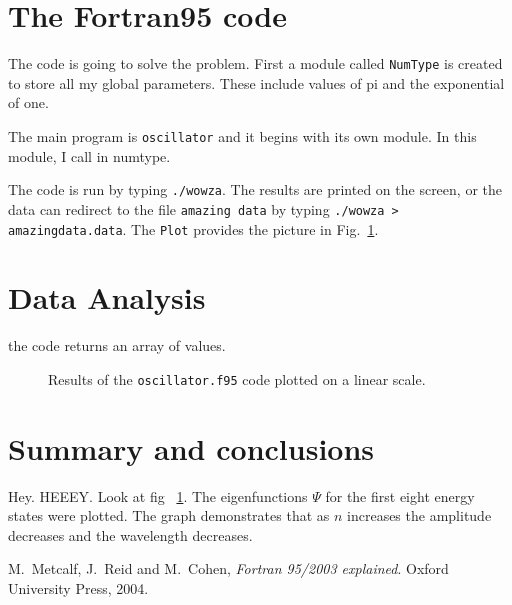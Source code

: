 \documentclass[12pt]{article}
\begin{document}
\section{The Fortran95 code}

The code is going to solve the problem. First a module called {\tt NumType} is created to store all my global parameters. These include values of pi and the exponential of one. 


The main program is {\tt oscillator} and it begins with its own module. In this module, I call in numtype.



The code is run by typing {\tt ./wowza}. The results are printed on the screen, or the data can redirect to the file {\tt amazing data} by typing {\tt ./wowza > amazingdata.data}. The {\tt Plot} provides the picture in Fig.\ \ref{orbitstuff}. 

\section{Data Analysis}

the code returns an array of values.

\begin {figure}[!htb]
	\resizebox{\columnwidth}{!}{}
	\caption{Results of the {\tt oscillator.f95} code plotted on a linear scale. }
	\label{orbitstuff}
\end {figure}

\section{Summary and conclusions}

Hey. HEEEY. Look at fig \ \ref{orbitstuff}. The eigenfunctions $\Psi$ for the first eight energy states were plotted. The graph demonstrates that as $n$ increases the amplitude decreases and the wavelength decreases.

\begin{thebibliography}{}


 M.\ Metcalf, J.\ Reid and M.\ Cohen, {\it Fortran 95/2003 explained}. Oxford University Press, 2004.
 

\end{thebibliography}
\end{document}
